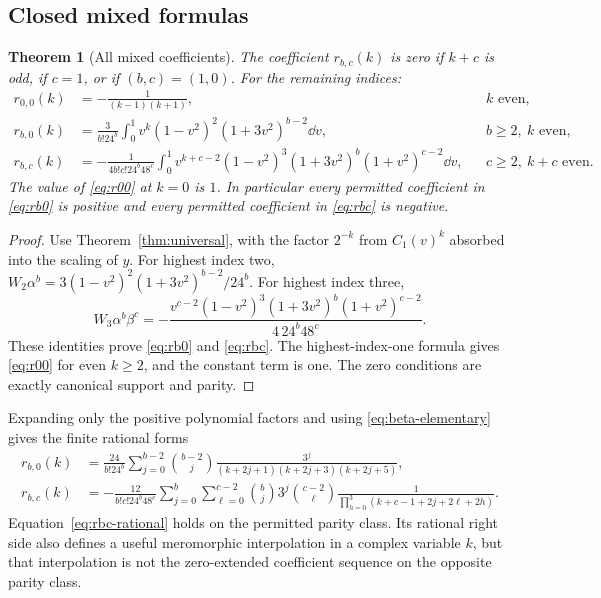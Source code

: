 \documentclass[11pt,letterpaper]{article}
\numberwithin{equation}{section}
\theoremstyle{plain}
\newtheorem{theorem}{Theorem}[section]
\theoremstyle{definition}
\theoremstyle{remark}
\begin{document}
\subsection{Closed mixed formulas}

\begin{theorem}[All mixed coefficients]\label{thm:mixed}
The coefficient $r_{b,c}(k)$ is zero if $k+c$ is odd, if $c=1$, or if $(b,c)=(1,0)$. For the remaining indices:
\begin{align}
 r_{0,0}(k)&=-\frac1{(k-1)(k+1)}, &&k\text{ even},\label{eq:r00}\\
 r_{b,0}(k)&=\frac3{b!24^b}\int_0^1
      v^k(1-v^2)^2(1+3v^2)^{b-2}\dd v,
      &&b\ge2,\ k\text{ even},\label{eq:rb0}\\
 r_{b,c}(k)&=-\frac1{4b!c!24^b48^c}\int_0^1
      v^{k+c-2}(1-v^2)^3(1+3v^2)^b(1+v^2)^{c-2}\dd v,
      &&c\ge2,\ k+c\text{ even}.\label{eq:rbc}
\end{align}
The value of \eqref{eq:r00} at $k=0$ is $1$. In particular every permitted coefficient in \eqref{eq:rb0} is positive and every permitted coefficient in \eqref{eq:rbc} is negative.
\end{theorem}
\begin{proof}
Use Theorem~\ref{thm:universal}, with the factor $2^{-k}$ from $C_1(v)^k$ absorbed into the scaling of $y$. For highest index two, $W_2\alpha^b=3(1-v^2)^2(1+3v^2)^{b-2}/24^b$. For highest index three,
\[
 W_3\alpha^b\beta^c
 =-\frac{v^{c-2}(1-v^2)^3(1+3v^2)^b(1+v^2)^{c-2}}
          {4\,24^b48^c}.
\]
These identities prove \eqref{eq:rb0} and \eqref{eq:rbc}. The highest-index-one formula gives \eqref{eq:r00} for even $k\ge2$, and the constant term is one. The zero conditions are exactly canonical support and parity.
\end{proof}

Expanding only the positive polynomial factors and using \eqref{eq:beta-elementary} gives the finite rational forms
\begin{align}
 r_{b,0}(k)&=\frac{24}{b!24^b}
 \sum_{j=0}^{b-2}\binom{b-2}{j}
 \frac{3^j}{(k+2j+1)(k+2j+3)(k+2j+5)},\label{eq:rb-rational}\\
 r_{b,c}(k)&=-\frac{12}{b!c!24^b48^c}
 \sum_{j=0}^{b}\sum_{\ell=0}^{c-2}
 \binom bj3^j\binom{c-2}{\ell}
 \frac1{\prod_{h=0}^3(k+c-1+2j+2\ell+2h)}.\label{eq:rbc-rational}
\end{align}
Equation~\eqref{eq:rbc-rational} holds on the permitted parity class. Its rational right side also defines a useful meromorphic interpolation in a complex variable $k$, but that interpolation is not the zero-extended coefficient sequence on the opposite parity class.
\end{document}
